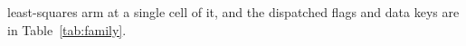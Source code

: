 \begin{table}[htbp]
{least-squares arm at a single cell of it, and the dispatched flags and data keys are in
Table~\ref{tab:family}.}
\label{tab:members}
\end{table}

